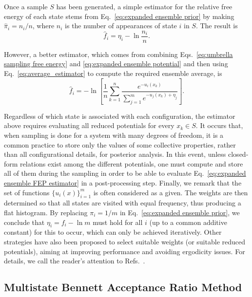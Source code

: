 \documentclass[aip,jcp,reprint,amsmath,amssymb]{revtex4-1}
\begin{document}
Once a sample $S$ has been generated, a simple estimator for the relative free energy of each state stems from Eq.~\eqref{eq:expanded ensemble prior} by making $\hat \pi_i = n_i/n$, where $n_i$ is the number of appearances of state $i$ in $S$. The result is
\begin{equation}
\label{eq:expanded ensemble histogram estimator}
\hat f_i = \eta_i - \ln \frac{n_i}{n}.
\end{equation}

However, a better estimator, which comes from combining Eqs.~\eqref{eq:umbrella sampling free energy} and \eqref{eq:expanded ensemble potential} and then using Eq.~\eqref{eq:average_estimator} to compute the required ensemble average, is
\begin{equation}
\label{eq:expanded ensemble FEP estimator}
\hat f_i = -\ln \left[ \frac{1}{n}\sum_{k=1}^n \frac{e^{-u_i(x_k)}}{\sum_{j=1}^m e^{-u_j(x_k) + \eta_j}} \right].
\end{equation}

Regardless of which state is associated with each configuration, the estimator above requires evaluating all reduced potentials for every $x_k \in S$. It occurs that, when sampling is done for a system with many degrees of freedom, it is a common practice to store only the values of some collective properties, rather than all configurational details, for posterior analysis. In this event, unless closed-form relations exist among the different potentials, one must compute and store all of them during the sampling in order to be able to evaluate Eq.~\eqref{eq:expanded ensemble FEP estimator} in a post-processing step. Finally, we remark that the set of functions $\{u_i(x)\}_{i=1}^m$ is often considered as a given. The weights are then determined so that all states are visited with equal frequency, thus producing a flat histogram. By replacing $\pi_i = 1/m$ in Eq.~\eqref{eq:expanded ensemble prior}, we conclude that $\eta_i = f_i - \ln m$ must hold for all $i$ (up to a common additive constant) for this to occur, which can only be achieved iteratively. Other strategies have also been proposed to select suitable weights (or suitable reduced potentials), aiming at improving performance and avoiding ergodicity issues. For details, we call the reader's attention to Refs.~.

\subsection{Multistate Bennett Acceptance Ratio Method}
\end{document}
